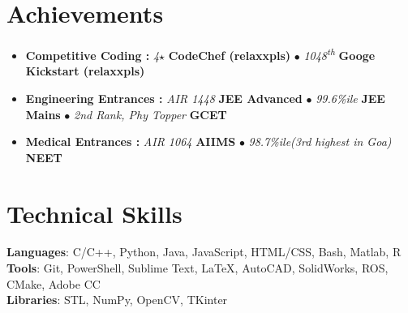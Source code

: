 \documentclass[a4paper,11pt]{article}
\newcommand*{\cvrank}[2]{\footnotesize{\textit{#1} \textbf{#2} $\bullet$}}
\newcommand*{\cvrankend}[2]{\footnotesize{\textit{#1} \textbf{#2} \\ }
}
\begin{document}
  \section{Achievements}
   \begin{itemize}[leftmargin=0.15in, label={}]
      \item{ \small{
        \textbf{Competitive Coding :}
        \cvrank{4\hspace{1pt}$\star$}{CodeChef (relaxxpls)}
        \cvrankend{1048\textsuperscript{th}}{Googe Kickstart (relaxxpls)}
      }} \vspace{-.5mm}
      \item{ \small{
        \textbf{Engineering Entrances :}
        \cvrank{AIR 1448}{JEE Advanced}
        \cvrank{99.6\hspace{1pt}\%\hspace{1pt}ile}{JEE Mains}
        \cvrankend{2\hspace{1pt}nd Rank, Phy Topper}{GCET}
      }} \vspace{-.5mm}
      \item{ \small{
        \textbf{Medical Entrances :}
        \cvrank{AIR 1064}{AIIMS}
        \cvrankend{98.7\hspace{1pt}\%\hspace{1pt}ile\hspace{2pt}(3rd highest in Goa)}{NEET}
      }} \vspace{-0mm}
   \end{itemize}

  \section{Technical Skills}
   \begin{itemize}[leftmargin=0.15in, label={}]
      \small{\item{
       \textbf{Languages}{: C/C++, Python, Java, JavaScript, HTML/CSS, Bash, Matlab, R} \\
       \textbf{Tools}{: Git, PowerShell, Sublime Text, \LaTeX, AutoCAD, SolidWorks, ROS, CMake, Adobe CC} \\
       \textbf{Libraries}{: STL, NumPy, OpenCV, TKinter} 
      }}
   \end{itemize}
\end{document}
